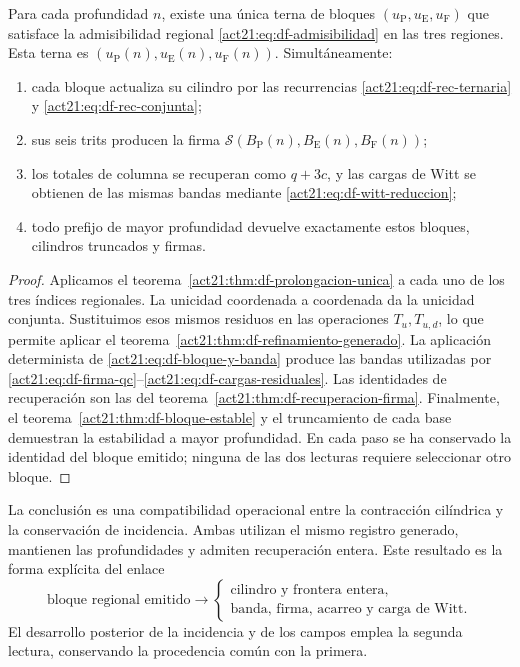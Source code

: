 \begin{theorem}
\label{act21:thm:df-composicion-conjunta}
Para cada profundidad \(n\), existe una única terna de bloques
\((u_{\mathrm P},u_{\mathrm E},u_{\mathrm F})\) que satisface la
admisibilidad regional \eqref{act21:eq:df-admisibilidad} en las tres regiones.
Esta terna es \((u_{\mathrm P}(n),u_{\mathrm E}(n),u_{\mathrm F}(n))\).
Simultáneamente:
\begin{enumerate}
\item cada bloque actualiza su cilindro por las recurrencias
\eqref{act21:eq:df-rec-ternaria} y \eqref{act21:eq:df-rec-conjunta};
\item sus seis trits producen la firma
\(\mathcal S(B_{\mathrm P}(n),B_{\mathrm E}(n),B_{\mathrm F}(n))\);
\item los totales de columna se recuperan como \(q+3c\), y las cargas
de Witt se obtienen de las mismas bandas mediante
\eqref{act21:eq:df-witt-reduccion};
\item todo prefijo de mayor profundidad devuelve exactamente estos
bloques, cilindros truncados y firmas.
\end{enumerate}
\end{theorem}

\begin{proof}
Aplicamos el teorema~\ref{act21:thm:df-prolongacion-unica} a cada uno de los tres
índices regionales. La unicidad coordenada a coordenada da la unicidad
conjunta. Sustituimos esos mismos residuos en las operaciones
\(T_u,T_{u,d}\), lo que permite aplicar el
teorema~\ref{act21:thm:df-refinamiento-generado}. La aplicación determinista de
\eqref{act21:eq:df-bloque-y-banda} produce las bandas utilizadas por
\eqref{act21:eq:df-firma-qc}--\eqref{act21:eq:df-cargas-residuales}. Las identidades
de recuperación son las del teorema~\ref{act21:thm:df-recuperacion-firma}.
Finalmente, el teorema~\ref{act21:thm:df-bloque-estable} y el truncamiento de
cada base demuestran la estabilidad a mayor profundidad. En cada paso se
ha conservado la identidad del bloque emitido; ninguna de las dos
lecturas requiere seleccionar otro bloque.
\end{proof}

La conclusión es una compatibilidad operacional entre la contracción
cilíndrica y la conservación de incidencia. Ambas utilizan el mismo
registro generado, mantienen las profundidades y admiten recuperación
entera. Este resultado es la forma explícita del enlace
\[
 \text{bloque regional emitido}
 \longrightarrow
 \begin{cases}
 \text{cilindro y frontera entera},\\
 \text{banda, firma, acarreo y carga de Witt}.
 \end{cases}
\]
El desarrollo posterior de la incidencia y de los campos emplea la
segunda lectura, conservando la procedencia común con la primera.
